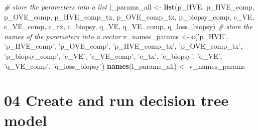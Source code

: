 \documentclass[
]{article}
\newenvironment{Shaded}{\begin{snugshade}}{\end{snugshade}}
\newcommand{\CommentTok}[1]{\textcolor[rgb]{0.56,0.35,0.01}{\textit{#1}}}
\newcommand{\KeywordTok}[1]{\textcolor[rgb]{0.13,0.29,0.53}{\textbf{#1}}}
\newcommand{\NormalTok}[1]{#1}
\newcommand{\StringTok}[1]{\textcolor[rgb]{0.31,0.60,0.02}{#1}}
\begin{document}
\begin{Shaded}
\begin{Highlighting}[]
\CommentTok{# store the parameters into a list}
\NormalTok{l_params_all <-}\StringTok{ }\KeywordTok{list}\NormalTok{(p_HVE, p_HVE_comp, p_OVE_comp, p_HVE_comp_tx, }
\NormalTok{                     p_OVE_comp_tx, p_biopsy_comp, }
\NormalTok{                     c_VE, c_VE_comp, c_tx, c_biopsy, }
\NormalTok{                     q_VE, q_VE_comp, q_loss_biopsy)}
\CommentTok{# store the names of the parameters into a vector}
\NormalTok{v_names_params <-}\StringTok{ }\KeywordTok{c}\NormalTok{(}\StringTok{'p_HVE'}\NormalTok{, }\StringTok{'p_HVE_comp'}\NormalTok{, }\StringTok{'p_OVE_comp'}\NormalTok{, }\StringTok{'p_HVE_comp_tx'}\NormalTok{, }
                    \StringTok{'p_OVE_comp_tx'}\NormalTok{, }\StringTok{'p_biopsy_comp'}\NormalTok{, }
                    \StringTok{'c_VE'}\NormalTok{, }\StringTok{'c_VE_comp'}\NormalTok{,  }\StringTok{'c_tx'}\NormalTok{, }\StringTok{'c_biopsy'}\NormalTok{, }
                    \StringTok{'q_VE'}\NormalTok{, }\StringTok{'q_VE_comp'}\NormalTok{, }\StringTok{'q_loss_biopsy'}\NormalTok{)}
\KeywordTok{names}\NormalTok{(l_params_all) <-}\StringTok{ }\NormalTok{v_names_params}
\end{Highlighting}
\end{Shaded}

\hypertarget{create-and-run-decision-tree-model}{%
\section{04 Create and run decision tree
model}\label{create-and-run-decision-tree-model}}
\end{document}
